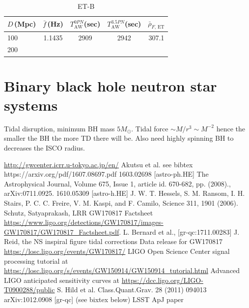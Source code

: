 \documentclass[11pt,a4paper]{article}
\newcommand\T{\rule{0pt}{2.6ex}}       %
\newcommand\B{\rule[-1.2ex]{0pt}{0pt}} %
\begin{document}
\begin{table}[h]
\centering
\begin{tabular}{lcccc}
\hline
$D\,$(Mpc) & $\bar{f}\,$(Hz) & $T^{0PN}_\text{AW}$(sec) & $T^{3.5PN}_\text{AW}$(sec)& $\bar{\rho}_{F,\,\text{ET}}$\T\B\\
\hline
100 & 1.1435 & 2909 & 2942 & 307.1 \T\\
200  \\
\hline
\end{tabular}
\caption{ET-B}\label{table:ET}
\end{table}



\section{Binary black hole neutron star systems}
Tidal disruption, minimum BH mass $5 M_\odot$. Tidal force $\sim M/r^3 \sim M^{-2}$ hence the smaller the BH the more TD there will be.
Also need highly spinning BH to decreases the ISCO radius.
 
 
 
\begin{thebibliography}{}
 \url{http://gwcenter.icrr.u-tokyo.ac.jp/en/}
 Akutsu et al. see bibtex
 https://arxiv.org/pdf/1607.08697.pdf
 1603.02698 [astro-ph.HE]
 The Astrophysical Journal, Volume 675, Issue 1, article id. 670-682, pp. (2008)., arXiv:0711.0925.  
 1610.05309 [astro-h.HE]
 J. W. T. Hessels, S. M. Ransom, I. H. Stairs, P. C. C. Freire,
V. M. Kaspi, and F. Camilo, Science 311, 1901 (2006).
 Schutz, Satyaprakash, LRR
 GW170817 Factsheet \url{https://www.ligo.org/detections/GW170817/images-GW170817/GW170817_Factsheet.pdf}.
 L. Bernard et al., [gr-qc:1711.00283]
 J. Reid, the NS inspiral figure tidal corrections
 Data release for GW170817 \url{https://losc.ligo.org/events/GW170817/}
 LIGO Open Science Center signal processing tutorial at \url{https://losc.ligo.org/s/events/GW150914/GW150914_tutorial.html}
 Advanced LIGO anticipated sensitivity curves at \url{https://dcc.ligo.org/LIGO-T0900288/public}
 S. Hild et al. Class.Quant.Grav. 28 (2011) 094013  arXiv:1012.0908 [gr-qc]  (see bixtex below)
 LSST
 ApJ paper
\end{thebibliography}
 
 
 
 
 
 
 
 
 
 
\end{document}
